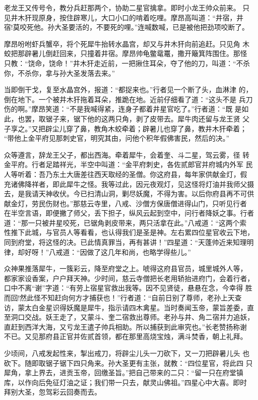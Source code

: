 老龙王又传号令，教分兵赶那两个，协助二星官擒拿。即时小龙王帅众前来。
只见井木犴现原身，按住辟寒儿，大口小口的啃着吃哩。摩昂高叫道：“井宿，井
宿!莫咬死他。孙大圣要活的，不要死的哩。”连喊数喊，已是被他把劲项咬断了。

摩昂吩咐虾兵蟹卒，将个死犀牛抬转水晶宫，却又与井木犴向前追赶。只见角
木蛟把那辟暑儿倒赶回来，只撞着井宿。摩昂帅龟鳖鼋鼍，撒开簸箕阵围住。那怪
只教：“饶命，饶命！”井木犴走近前，一把揪住耳朵，夺了他的刀，叫道：“不杀
你，不杀你，拿与孙大圣发落去来。”

当即倒干戈，复至水晶宫外，报道：“都捉来也。”行者见一个断了头，血淋津
的，倒在地下。一个被井木犴拖着耳朵，推跪在地。近前仔细看了道：“这头不是
兵刀伤的啊。”摩昂笑道：“不是我喊得紧，连身子都着井星官吃了。”行者道：“既
是如此，也罢，取锯子来，锯下他的这两只角，剥了皮带去。犀牛肉还留与龙王贤
父子享之。”又把辟尘儿穿了鼻，教角木蛟牵着；辟暑儿也穿了鼻，教井木犴牵着；
“带他上金平府见那刺史官，明究其由，问他个积年假佛害民，然后的决。”

众等遵言，辞龙王父子，都出西海。牵着犀牛，会着奎、斗二星，驾云雾，径
转金平府。行者足踏祥光，半空中叫道：“金平府刺史，各佐贰郎官并府城内外军
民人等听着：吾乃东土大唐差往西天取经的圣僧。你这府县，每年家供献金灯，假
充诸佛降祥者，即此犀牛之怪。我等过此，因元夜观灯，见这怪将灯油并我师父摄
去，是我请天神收伏。今已扫清山洞，剿尽妖魔，不得为害。以后你府县再不可供
献金灯，劳民伤财也。”那慈云寺里，八戒、沙僧方保唐僧进得山门，只听见行者
在半空言语，即便撇了师父，丢下担子，纵风云起到空中，问行者降妖之事。行者
道：“那一只被井星咬死，已锯角剥皮带来，两只活拿在此。”八戒道：“这两个索
性推下此城，与官员人等看看，也认得我们是圣是神。左右累四位星官收云下地，
同到府堂，将这怪的决。已此情真罪当，再有甚讲！”四星道：“天蓬帅近来知理明
律，却好呀！”八戒道：“因做了这几年和尚，也略学得些儿。”

众神果推落犀牛，一簇彩云，降至府堂之上。唬得这府县官员，城里城外人等，
都家家设香案，户户拜天神。少时间，慈云寺僧把长老用轿抬进府门，会着行者，
口中不离“谢”字道：“有劳上宿星官救出我等。因不见贤徒，悬悬在念，今幸得
胜而回!然此怪不知赶向何方才捕获也！”行者道：“自前日别了尊师，老孙上天查
访，蒙太白金星识得妖魔是犀牛，指示请四木禽星。当时奏闻玉帝，蒙旨差委，直
至洞口交战。妖王走了，又蒙斗、奎二宿救出尊师。老孙与井、角二宿并力追妖，
直赶到西洋大海，又亏龙王遣子帅兵相助。所以捕获到此审究也。”长老赞扬称谢
不已。又见那府县正官并佐贰首领，都在那里高烧宝烛，满斗焚香，朝上礼拜。

少顷间，八戒发起性来，掣出戒刀，将辟尘儿头一刀砍下，又一刀把辟暑儿头
也砍下。随即取锯子锯下四只角来。孙大圣更有主张，就教：“四位星官，将此四
只犀角，拿上界去，进贡玉帝，回缴圣旨。”把自己带来的二只：“留一只在府堂镇
库，以作向后免征灯油之证；我们带一只去，献灵山佛祖。”四星心中大喜。即时
拜别大圣，忽驾彩云回奏而去。

